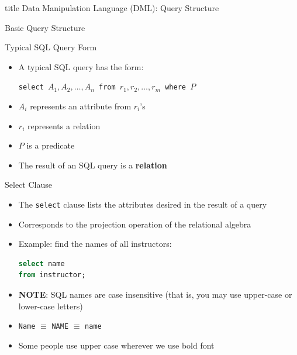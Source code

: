 \documentclass[aspectratio=169, xcolor=dvipsnames]{beamer}
\begin{document}
\begin{frame}
  \vfill
  \centering
  \begin{beamercolorbox}[sep=8pt,center,shadow=true,rounded=true]{title}
    Data Manipulation Language (DML): Query Structure\par%
  \end{beamercolorbox}
  \vfill
\end{frame}

\begin{frame}{Basic Query Structure}
    \begin{block}{Typical SQL Query Form}
        \begin{itemize}[<+->]
            \item A typical SQL query has the form:
            \begin{center}
                \texttt{select $A_1, A_2, \dots, A_n$ \newline
                        from $r_1, r_2, \dots, r_m$ \newline
                        where $P$}
            \end{center}
            \item $A_i$ represents an attribute from $r_i$'s
            \item $r_i$ represents a relation
            \item $P$ is a predicate
            \item The result of an SQL query is a \textbf{relation}
        \end{itemize}
    \end{block}
\end{frame}

\begin{frame}[fragile]{Select Clause}
    \begin{itemize}[<+->]
        \item The \texttt{select} clause lists the attributes desired in the result of a query
        \item Corresponds to the projection operation of the relational algebra
        \item Example: find the names of all instructors:
        \begin{lstlisting}[language=SQL]
select name
from instructor;
        \end{lstlisting}
        \item \textbf{NOTE}: SQL names are case insensitive (that is, you may use upper-case or lower-case letters)
        \item \texttt{Name} $\equiv$ \texttt{NAME} $\equiv$ \texttt{name}
        \item Some people use upper case wherever we use bold font
    \end{itemize}
\end{frame}
\end{document}

